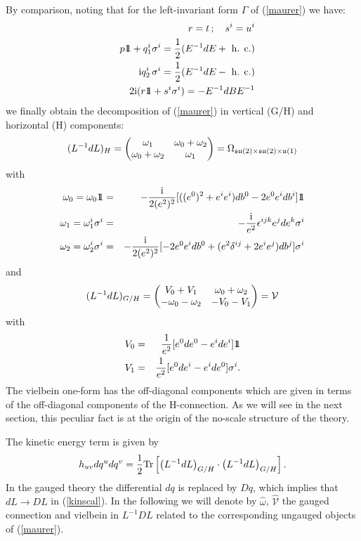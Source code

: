 \documentclass[a4paper,12pt]{article}
\begin{document}
By comparison, noting that for the left-invariant form $\Gamma$ of (\ref{maurer}) we have:
\begin{eqnarray}
&&r=t \,; \quad s^i = u^i  \nonumber\\
&& p \relax{\rm 1\kern-.35em 1} + q_1^i  \sigma^i = \frac 12 (E^{-1} dE + \mbox{ h. c.}) \nonumber\\
&& \mathrm{i} q_2^i \, \sigma^i = \frac 12 (E^{-1} dE - \mbox{ h. c.}) \nonumber\\
&&2 \mathrm{i} (r \relax{\rm 1\kern-.35em 1} + s^i \sigma^i) = -E^{-1} dB E^{-1}
\end{eqnarray}
we finally obtain the decomposition of (\ref{maurer}) in vertical (G/H) and horizontal (H) components:
\begin{equation}
(L^{-1} dL)_H = \begin{pmatrix} \omega_1 & \omega_0 + \omega_2 \cr \omega_0 + \omega_2 & \omega_1\cr
\end{pmatrix} = \Omega_{\mathfrak{su}(2)\times \mathfrak{su}(2)\times \mathfrak{u}(1)}
\end{equation}
with
\begin{eqnarray}
\omega_0 = \omega_0 \relax{\rm 1\kern-.35em 1}  & =&-\frac {\mathrm{i}} {2(e^2)^2}[((e^0)^2 +e^ie^i)db^0 -2e^0e^i db^i]\relax{\rm 1\kern-.35em 1} \nonumber\\
\omega_1 = \omega_1^i \sigma^i& =& -\frac {\mathrm{i}} {e^2} \epsilon^{ijk} e^jde^k  \sigma^i \nonumber\\
\omega_2 = \omega_2^i \sigma^i& =& -\frac {\mathrm{i}} {2(e^2)^2}[ -2e^0e^i db^0+ (e^2\delta^{ij} +2e^ie^j)db^j] \sigma^i
\end{eqnarray}
 and
\begin{equation}
(L^{-1} dL)_{G/H} = \begin{pmatrix} V_0+V_1
 & \omega_0 + \omega_2 \cr -\omega_0 - \omega_2 & -V_0-V_1\cr
\end{pmatrix}= {\mathcal V}
\end{equation}
with
\begin{eqnarray}
V_0   & =&\frac 1 {e^2}[e^0 de^0 -e^ide^i]\relax{\rm 1\kern-.35em 1} \nonumber\\
V_1  & =&\frac 1 {e^2}[e^0 de^i -e^ide^0]\sigma^i .
\end{eqnarray}
The vielbein one-form has the off-diagonal components which are given in terms of the off-diagonal components of the H-connection.
As we will see in the next section, this peculiar fact is at the origin of the no-scale structure of the theory.

The kinetic energy term is given by 
 \begin{equation}
h_{uv} d q^u d q^v = \frac 12 {\rm Tr} \left[\left(L^{-1} dL\right)_{G/H} \cdot
\left(L^{-1} dL\right)_{G/H}\right].\label{kinscal}
\end{equation}
In the gauged theory the differential $dq$ is replaced by $Dq$, which implies that $dL \to DL$ in (\ref{kinscal}). 
In the following we will denote by ${\hat \omega}$, ${\hat{\mathcal V}}$  the gauged connection and vielbein in $L^{-1}DL$
related to the corresponding ungauged objects of (\ref{maurer}).
\bigskip
\end{document}
